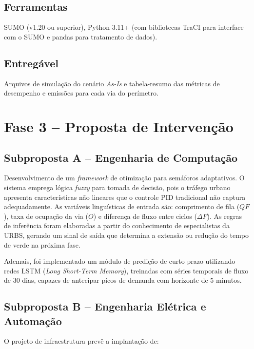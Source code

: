 \documentclass[12pt,a4paper,oneside]{abntex2}
\begin{document}
\subsection{Ferramentas}

SUMO (v1.20 ou superior), Python 3.11+ (com bibliotecas TraCI para interface com o SUMO e pandas para tratamento de dados).

\subsection{Entregável}

Arquivos de simulação do cenário \textit{As-Is} e tabela-resumo das métricas de desempenho e emissões para cada via do perímetro.

\section{Fase 3 -- Proposta de Intervenção}

\subsection{Subproposta A -- Engenharia de Computação}

Desenvolvimento de um \textit{framework} de otimização para semáforos adaptativos. O sistema emprega lógica \textit{fuzzy} para tomada de decisão, pois o tráfego urbano apresenta características não lineares que o controle PID tradicional não captura adequadamente. As variáveis linguísticas de entrada são: comprimento de fila ($QF$), taxa de ocupação da via ($O$) e diferença de fluxo entre ciclos ($\Delta F$). As regras de inferência foram elaboradas a partir do conhecimento de especialistas da URBS, gerando um sinal de saída que determina a extensão ou redução do tempo de verde na próxima fase.

Ademais, foi implementado um módulo de predição de curto prazo utilizando redes LSTM (\textit{Long Short-Term Memory}), treinadas com séries temporais de fluxo de 30 dias, capazes de antecipar picos de demanda com horizonte de 5 minutos.

\subsection{Subproposta B -- Engenharia Elétrica e Automação}

O projeto de infraestrutura prevê a implantação de:
\end{document}
